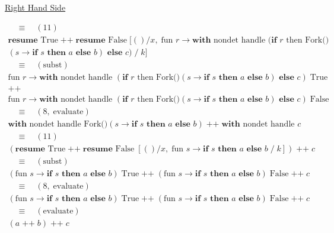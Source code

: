 \documentclass[logo,bsc,singlespacing,parskip]{infthesis}
\begin{document}
\underline{Right Hand Side}



\[
\begin{array}{l}
\quad \equiv \quad (11) \\[5pt]
\textbf{resume } \text{True} \;\texttt{++}\; \textbf{resume } \text{False} \; [()/x,\; \text{fun } r \rightarrow \textbf{with } \text{nondet handle } (\textbf{if } r \text{ then Fork()} \\(s \rightarrow \textbf{if } s \textbf{ then } a \textbf{ else } b) \textbf{ else } c) \;/\; k] \\[5pt]

\quad \equiv \quad (\text{subst}) \\[5pt]
\text{fun } r \rightarrow \textbf{with } \text{nondet handle } (\textbf{if } r \text{ then Fork()}(s \rightarrow \textbf{if } s \textbf{ then } a \textbf{ else } b) \textbf{ else } c) \;\text{True} \\
\texttt{++} \\
\text{fun } r \rightarrow \textbf{with } \text{nondet handle } (\textbf{if } r \text{ then Fork()}(s \rightarrow \textbf{if } s \textbf{ then } a \textbf{ else } b) \textbf{ else } c) \;\text{False} \\[5pt]

\quad \equiv \quad (8,\; \text{evaluate}) \\[5pt]
\textbf{with } \text{nondet handle } \text{Fork()}(s \rightarrow \textbf{if } s \textbf{ then } a \textbf{ else } b) \;\texttt{++}\; \textbf{with } \text{nondet handle } c \\[5pt]

\quad \equiv \quad (11) \\[5pt]
(\textbf{resume } \text{True} \;\texttt{++}\; \textbf{resume } \text{False} \; [()/x,\; \text{fun } s \rightarrow \textbf{if } s \textbf{ then } a \textbf{ else } b \;/\; k]) \;\texttt{++}\; c \\[5pt]

\quad \equiv \quad (\text{subst}) \\[5pt]
(\text{fun } s \rightarrow \textbf{if } s \textbf{ then } a \textbf{ else } b)\; \text{True} \;\texttt{++}\; (\text{fun } s \rightarrow \textbf{if } s \textbf{ then } a \textbf{ else } b)\; \text{False} \;\texttt{++}\; c \\[5pt]

\quad \equiv \quad (8,\; \text{evaluate}) \\[5pt] 
(\text{fun } s \rightarrow \textbf{if } s \textbf{ then } a \textbf{ else } b)\; \text{True} \;\texttt{++}\; (\text{fun } s \rightarrow \textbf{if } s \textbf{ then } a \textbf{ else } b)\; \text{False} \;\texttt{++}\; c \\[5pt]

\quad \equiv \quad (\text{evaluate}) \\[5pt]
(a \;\texttt{++}\; b) \;\texttt{++}\; c
\end{array}
\]
\end{document}
